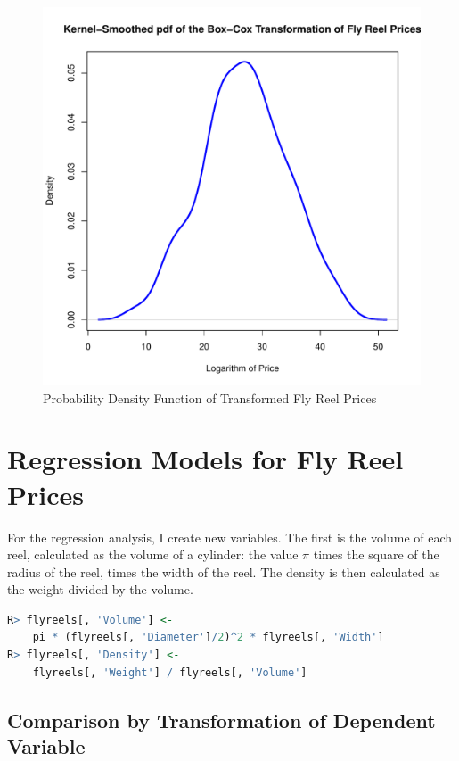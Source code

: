 \documentclass[11pt]{paper}
\begin{document}
\begin{figure}[h!]
  \centering
  \includegraphics[scale = 0.5, keepaspectratio=true]{../Figures/density_trans_prices}
  \caption{Probability Density Function of Transformed Fly Reel Prices} \label{fig:density_trans_prices}
\end{figure}


\pagebreak
\section{Regression Models for Fly Reel Prices}


For the regression analysis, I create new variables.
The first is the volume of each reel, 
calculated as the volume of a cylinder: 
the value $\pi$ times the square of the radius of the reel,
times the width of the reel. 
The density is then calculated as the weight 
divided by the volume. 

\begin{lstlisting}[language=R]
R> flyreels[, 'Volume'] <- 
	pi * (flyreels[, 'Diameter']/2)^2 * flyreels[, 'Width']
R> flyreels[, 'Density'] <- 
	flyreels[, 'Weight'] / flyreels[, 'Volume']
\end{lstlisting}



\subsection{Comparison by Transformation of Dependent Variable}
\end{document}
